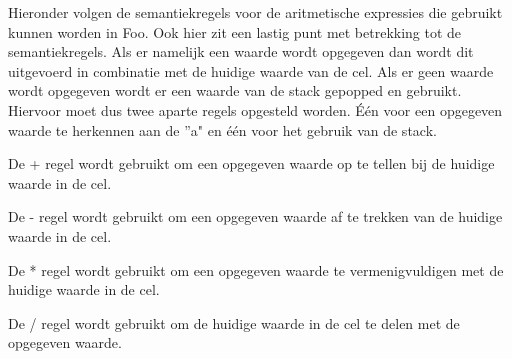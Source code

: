 \documentclass[11pt]{article}
\begin{document}

Hieronder volgen de semantiekregels voor de aritmetische expressies die gebruikt kunnen worden in Foo.
Ook hier zit een lastig punt met betrekking tot de semantiekregels.
Als er namelijk een waarde wordt opgegeven dan wordt dit uitgevoerd in combinatie met de huidige waarde van de cel.
Als er geen waarde wordt opgegeven wordt er een waarde van de stack gepopped en gebruikt.
Hiervoor moet dus twee aparte regels opgesteld worden. 
Één voor een opgegeven waarde te herkennen aan de ''a" en één voor het gebruik van de stack.

De + regel wordt gebruikt om een opgegeven waarde op te tellen bij de huidige waarde in de cel.
\begin{prooftree}
\end{prooftree}

\begin{prooftree}
\end{prooftree}

De - regel wordt gebruikt om een opgegeven waarde af te trekken van de huidige waarde in de cel.
\begin{prooftree}
\end{prooftree}

\begin{prooftree}
\end{prooftree}
De * regel wordt gebruikt om een opgegeven waarde te vermenigvuldigen met de huidige waarde in de cel.
\begin{prooftree}
\end{prooftree}

\begin{prooftree}
\end{prooftree}

De / regel wordt gebruikt om de huidige waarde in de cel te delen met de opgegeven waarde.
\begin{prooftree}
\end{prooftree}
\end{document}
